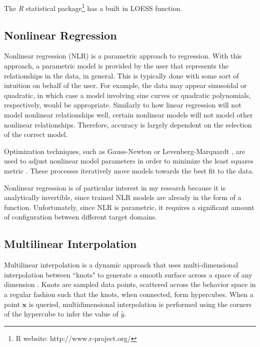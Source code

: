 The \textit{R} statistical package\footnote{R website: http://www.r-project.org/} has a built in LOESS function.

\subsection{Nonlinear Regression}

Nonlinear regression (NLR) is a parametric approach to regression.
With this approach, a parametric model is provided by the user that represents the relationships in the data, in general.
This is typically done with some sort of intuition on behalf of the user.
For example, the data may appear sinusoidal or quadratic, in which case a model involving sine curves or quadratic polynomials, respectively, would be appropriate.
Similarly to how linear regression will not model nonlinear relationships well, certain nonlinear models will not model other nonlinear relationships.
Therefore, accuracy is largely dependent on the selection of the correct model.

Optimization techniques, such as Gauss-Newton or Levenberg-Marquardt \cite{mor1977levenberg}, are used to adjust nonlinear model parameters in order to minimize the least squares metric \cite{gallant1975nonlinear}.
These processes iteratively move models towards the best fit to the data.

Nonlinear regression is of particular interest in my research because it is analytically invertible, since trained NLR models are already in the form of a function.
Unfortunately, since NLR is parametric, it requires a significant amount of configuration between different target domains.





\subsection{Multilinear Interpolation}

Multilinear interpolation is a dynamic approach that uses multi-dimensional interpolation between ``knots" to generate a smooth surface across a space of any dimension \cite{davies1997multidimensional}.
Knots are sampled data points, scattered across the behavior space in a regular fashion such that the knots, when connected, form hypercubes.
When a point $\mathbf x$ is queried, multidimensional interpolation is performed using the corners of the hypercube to infer the value of $\hat y$.


